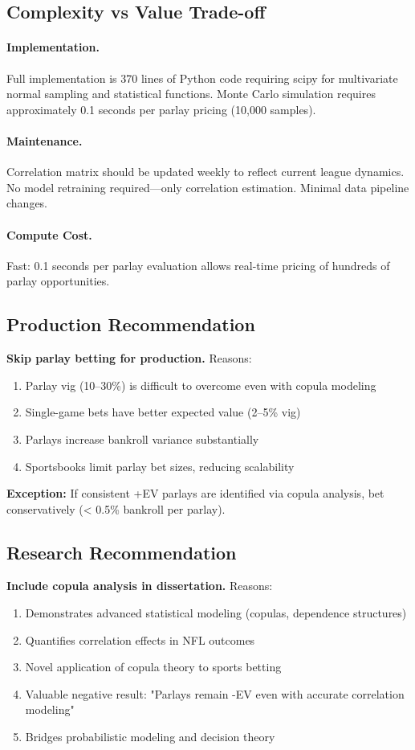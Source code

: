 \documentclass[12pt]{report}  %
\numberwithin{equation}{section}
\theoremstyle{plain}
\theoremstyle{definition}
\theoremstyle{remark}
\begin{document}
\subsection{Complexity vs Value Trade-off}

\paragraph{Implementation.}
Full implementation is 370 lines of Python code requiring scipy for multivariate normal sampling and statistical functions. Monte Carlo simulation requires approximately 0.1 seconds per parlay pricing (10,000 samples).

\paragraph{Maintenance.}
Correlation matrix should be updated weekly to reflect current league dynamics. No model retraining required—only correlation estimation. Minimal data pipeline changes.

\paragraph{Compute Cost.}
Fast: 0.1 seconds per parlay evaluation allows real-time pricing of hundreds of parlay opportunities.

\subsection{Production Recommendation}
\textbf{Skip parlay betting for production.} Reasons:
\begin{enumerate}
  \item Parlay vig (10--30\%) is difficult to overcome even with copula modeling
  \item Single-game bets have better expected value (2--5\% vig)
  \item Parlays increase bankroll variance substantially
  \item Sportsbooks limit parlay bet sizes, reducing scalability
\end{enumerate}

\textbf{Exception:} If consistent +EV parlays are identified via copula analysis, bet conservatively (< 0.5\% bankroll per parlay).

\subsection{Research Recommendation}
\textbf{Include copula analysis in dissertation.} Reasons:
\begin{enumerate}
  \item Demonstrates advanced statistical modeling (copulas, dependence structures)
  \item Quantifies correlation effects in NFL outcomes
  \item Novel application of copula theory to sports betting
  \item Valuable negative result: "Parlays remain -EV even with accurate correlation modeling"
  \item Bridges probabilistic modeling and decision theory
\end{enumerate}
\end{document}
